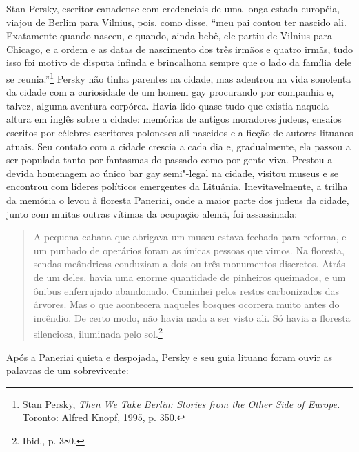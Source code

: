 %

Stan Persky, escritor canadense com credenciais de uma longa estada
européia, viajou de Berlim para Vilnius, pois, como disse, ``meu pai
contou ter nascido ali. Exatamente quando nasceu, e quando, ainda bebê,
ele partiu de Vilnius para Chicago, e a ordem e as datas de nascimento
dos três irmãos e quatro irmãs, tudo isso foi motivo de disputa infinda
e brincalhona sempre que o lado da família dele se reunia.''\footnote{Stan
  Persky, \emph{Then We Take Berlin: Stories from the Other Side of
  Europe.} Toronto: Alfred Knopf, 1995, p. 350.} Persky não tinha
parentes na cidade, mas adentrou na vida sonolenta da cidade com a
curiosidade de um homem gay procurando por companhia e, talvez, alguma
aventura corpórea. Havia lido quase tudo que existia naquela altura em
inglês sobre a cidade: memórias de antigos moradores judeus, ensaios
escritos por célebres escritores poloneses ali nascidos e a ficção de
autores lituanos atuais. Seu contato com a cidade crescia a cada dia e,
gradualmente, ela passou a ser populada tanto por fantasmas do passado
como por gente viva. Prestou a devida homenagem ao único bar gay
semi"-legal na cidade, visitou museus e se encontrou com líderes
políticos emergentes da Lituânia. Inevitavelmente, a trilha da memória o
levou à floresta Paneriai, onde a maior parte dos judeus da cidade,
junto com muitas outras vítimas da ocupação alemã, foi assassinada:

\begin{quote}
A pequena cabana que abrigava um museu estava fechada para reforma, e um
punhado de operários foram as únicas pessoas que vimos. Na floresta,
sendas meândricas conduziam a dois ou três monumentos discretos. Atrás
de um deles, havia uma enorme quantidade de pinheiros queimados, e um
ônibus enferrujado abandonado. Caminhei pelos restos carbonizados das
árvores. Mas o que acontecera naqueles bosques ocorrera muito antes do
incêndio. De certo modo, não havia nada a ser visto ali. Só havia a
floresta silenciosa, iluminada pelo sol.\footnote{Ibid., p. 380.}
\end{quote}

Após a Paneriai quieta e despojada, Persky e seu guia lituano foram
ouvir as palavras de um sobrevivente:

